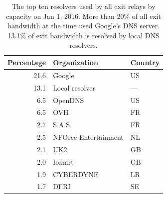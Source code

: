 \begin{table}[t]
	\centering
	\begin{tabular}{r l l}
	\toprule
	\textbf{Percentage} & \textbf{Organization} & \textbf{Country} \\
	\midrule
21.6 & Google & US \\ %
13.1 & Local resolver & --- \\ %
6.5 & OpenDNS & US \\ %
6.5 & OVH & FR \\ %
2.7 & S.A.S. & FR \\ %
2.5 & NFOrce Entertainment & NL \\ %
2.1 & UK2 & GB \\ %
2.0 & Iomart & GB \\ %
1.9 & CYBERDYNE & LR \\ %
1.7 & DFRI & SE \\ %

	\bottomrule
	\end{tabular}
	\caption{The top ten resolvers used by all exit relays by capacity on Jan 1,
	2016.  More than 20\% of all exit bandwidth at the time used Google's DNS
	server.  13.1\% of exit bandwidth is resolved by local DNS resolvers.}
	\label{tab:dns-resolvers}
\end{table}

